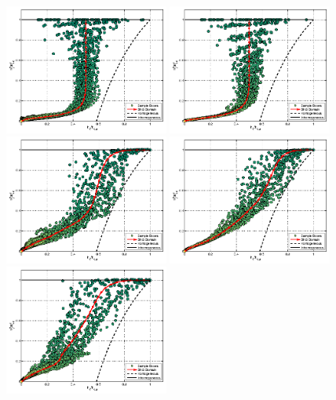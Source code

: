 \begin{figure}\centering
\includegraphics[width=0.48\textwidth]{Figures/mixing_cased1}
\includegraphics[width=0.48\textwidth]{Figures/mixing_casef1}\\
\includegraphics[width=0.48\textwidth]{Figures/mixing_cased2}
\includegraphics[width=0.48\textwidth]{Figures/mixing_casef2}\\
\includegraphics[width=0.48\textwidth]{Figures/mixing_cased3}

\end{figure}
